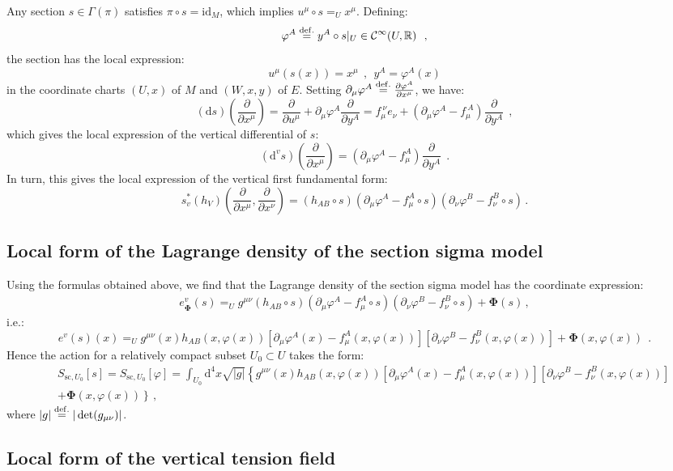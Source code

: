 \documentclass[10pt, cmp, numbook, final, a4paper]{svjour}
\newcommand{\eqdef}{\stackrel{{\rm def.}}{=}}
\def\R{\mathbb{R}}
\def\dd{\mathrm{d}}
\newcommand{\be}{\begin{equation*}}
\newcommand{\ee}{\end{equation*}}
\newcommand{\ben}{\begin{equation}}
\newcommand{\een}{\end{equation}}
\newcommand{\id}{\mathrm{id}}
\def\cC{{\mathcal C}}
\def\cC{\mathcal{C}}
\def\bPhi{\mathbf{\Phi}}
\def\sc{\mathrm{sc}}
\begin{document}
Any section $s\in \Gamma(\pi)$ satisfies $\pi\circ s=\id_M$, which
implies $u^\mu\circ s=_U x^\mu$. Defining:
\be
\varphi^A \eqdef y^A \circ s|_U\in \cC^\infty(U,\R)~~,
\ee
the section has the local expression:
\be
u^\mu(s(x))=x^\mu~~,~~y^A=\varphi^A(x)
\ee
in the coordinate charts $(U,x)$ of $M$ and $(W,x,y)$ of $E$. Setting
$\partial_\mu \varphi^A\eqdef \frac{\partial\varphi^A}{\partial
x^\mu}$, we have:
\be
(\dd s)(\frac{\partial}{\partial x^\mu})=\frac{\partial}{\partial u^\mu}+ \partial_\mu\varphi^A\frac{\partial}{\partial y^A}= f_{\mu}^{~\nu}e_\nu+(\partial_\mu \varphi^A-f_\mu^{~A}) \frac{\partial}{\partial y^A}~~,
\ee
which gives the local expression of the vertical differential of $s$:
\be
(\dd^v s)(\frac{\partial}{\partial x^\mu})=(\partial_\mu\varphi^A-f_\mu^A)\frac{\partial}{\partial y^A}~~.
\ee
In turn, this gives the local expression of the vertical first fundamental form: 
\be
s^\ast_v(h_V)(\frac{\partial}{\partial x^\mu}, \frac{\partial}{\partial x^\nu})=
(h_{AB}\circ s) (\partial_\mu\varphi^A-f_\mu^A\circ s) (\partial_\nu \varphi^B -f_\nu^B\circ s)\, .
\ee

\subsection{Local form of the Lagrange density of the section sigma model}

Using the formulas obtained above, we find that the Lagrange density
of the section sigma model has the coordinate expression:
\begin{eqnarray}
\label{evlocal}
e^v_\bPhi(s)=_U g^{\mu\nu} (h_{AB}\circ s)(\partial_\mu\varphi^A-f_\mu^A\circ s)(\partial_\nu \varphi^B-f_\nu^B\circ s)+\bPhi(s)\, ,
\end{eqnarray}
i.e.:
\ben
\label{evlocalcoords}
e^v(s)(x)=_U g^{\mu\nu}(x)h_{AB}(x,\varphi(x)) [\partial_\mu\varphi^A(x)-f_\mu^A(x,\varphi(x))] [\partial_\nu \varphi^B-f_\nu^B(x,\varphi(x))]+\bPhi(x,\varphi(x))~~.
\een
Hence the action for a relatively compact subset $U_0\subset U$ takes the form: 
\begin{eqnarray*}
\label{Slocal}
&& S_{\sc,U_0}[s]=S_{\sc,U_0}[\varphi]=\int_{U_0}\dd^4 x\sqrt{|g|} 
\left\{ g^{\mu\nu}(x)h_{AB}(x,\varphi(x)) [\partial_\mu\varphi^A(x)-f_\mu^A(x,\varphi(x))][\partial_\nu \varphi^B-f_\nu^B(x,\varphi(x))]\right. \\  && \left.  + \bPhi(x,\varphi(x))\right\}\, ,
\end{eqnarray*}
where $|g|\eqdef |\det (g_{\mu\nu})|$.

\subsection{Local form of the vertical tension field}
\end{document}
